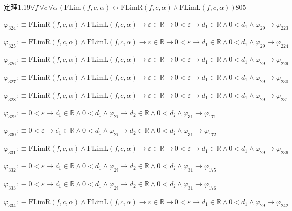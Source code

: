 \begin{fullproof}{定理1.19}{$\forall f\,\forall c\,\forall \alpha\,(\mathrm{FLim}(f,c,\alpha) \leftrightarrow \mathrm{FLimR}(f,c,\alpha) \land \mathrm{FLimL}(f,c,\alpha))$}{805}
\begin{abbrevlist}
\item $\varphi_{324} :\equiv \mathrm{FLimR}(f,c,\alpha) \land \mathrm{FLimL}(f,c,\alpha) \to \varepsilon \in \mathbb{R} \to 0 < \varepsilon \to d_{1} \in \mathbb{R} \land 0 < d_{1} \land \varphi_{29} \to \varphi_{223}$
\item $\varphi_{325} :\equiv \mathrm{FLimR}(f,c,\alpha) \land \mathrm{FLimL}(f,c,\alpha) \to \varepsilon \in \mathbb{R} \to 0 < \varepsilon \to d_{1} \in \mathbb{R} \land 0 < d_{1} \land \varphi_{29} \to \varphi_{224}$
\item $\varphi_{326} :\equiv \mathrm{FLimR}(f,c,\alpha) \land \mathrm{FLimL}(f,c,\alpha) \to \varepsilon \in \mathbb{R} \to 0 < \varepsilon \to d_{1} \in \mathbb{R} \land 0 < d_{1} \land \varphi_{29} \to \varphi_{229}$
\item $\varphi_{327} :\equiv \mathrm{FLimR}(f,c,\alpha) \land \mathrm{FLimL}(f,c,\alpha) \to \varepsilon \in \mathbb{R} \to 0 < \varepsilon \to d_{1} \in \mathbb{R} \land 0 < d_{1} \land \varphi_{29} \to \varphi_{230}$
\item $\varphi_{328} :\equiv \mathrm{FLimR}(f,c,\alpha) \land \mathrm{FLimL}(f,c,\alpha) \to \varepsilon \in \mathbb{R} \to 0 < \varepsilon \to d_{1} \in \mathbb{R} \land 0 < d_{1} \land \varphi_{29} \to \varphi_{231}$
\item $\varphi_{329} :\equiv 0 < \varepsilon \to d_{1} \in \mathbb{R} \land 0 < d_{1} \land \varphi_{29} \to d_{2} \in \mathbb{R} \land 0 < d_{2} \land \varphi_{31} \to \varphi_{171}$
\item $\varphi_{330} :\equiv 0 < \varepsilon \to d_{1} \in \mathbb{R} \land 0 < d_{1} \land \varphi_{29} \to d_{2} \in \mathbb{R} \land 0 < d_{2} \land \varphi_{31} \to \varphi_{172}$
\item $\varphi_{331} :\equiv \mathrm{FLimR}(f,c,\alpha) \land \mathrm{FLimL}(f,c,\alpha) \to \varepsilon \in \mathbb{R} \to 0 < \varepsilon \to d_{1} \in \mathbb{R} \land 0 < d_{1} \land \varphi_{29} \to \varphi_{236}$
\item $\varphi_{332} :\equiv 0 < \varepsilon \to d_{1} \in \mathbb{R} \land 0 < d_{1} \land \varphi_{29} \to d_{2} \in \mathbb{R} \land 0 < d_{2} \land \varphi_{31} \to \varphi_{175}$
\item $\varphi_{333} :\equiv 0 < \varepsilon \to d_{1} \in \mathbb{R} \land 0 < d_{1} \land \varphi_{29} \to d_{2} \in \mathbb{R} \land 0 < d_{2} \land \varphi_{31} \to \varphi_{176}$
\item $\varphi_{334} :\equiv \mathrm{FLimR}(f,c,\alpha) \land \mathrm{FLimL}(f,c,\alpha) \to \varepsilon \in \mathbb{R} \to 0 < \varepsilon \to d_{1} \in \mathbb{R} \land 0 < d_{1} \land \varphi_{29} \to \varphi_{242}$

\end{abbrevlist}
\end{fullproof}
